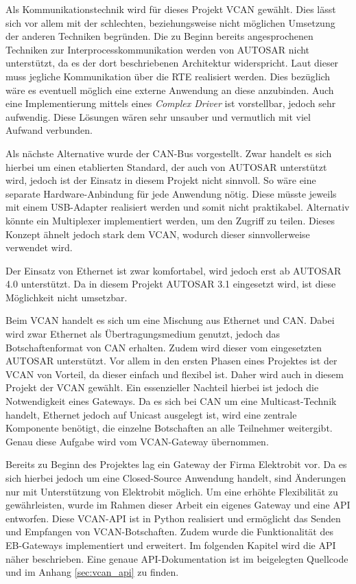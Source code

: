 \documentclass[
  a4paper,					    %
  twoside,
  DIV=calc,     				%
  bibliography=totoc,
  cleardoublepage=empty,
  ngerman,     					%
  final       					%
]{scrbook}
\begin{document}
Als Kommunikationstechnik wird für dieses Projekt VCAN gewählt. Dies lässt sich vor allem mit der schlechten, beziehungsweise nicht möglichen Umsetzung der anderen Techniken begründen. Die zu Beginn bereits angesprochenen Techniken zur Interprocesskommunikation werden von AUTOSAR nicht unterstützt, da es der dort beschriebenen Architektur widerspricht. Laut dieser muss jegliche Kommunikation über die RTE realisiert werden. Dies bezüglich wäre es eventuell möglich eine externe Anwendung an diese anzubinden. Auch eine Implementierung mittels eines \emph{Complex Driver} ist vorstellbar, jedoch sehr aufwendig. Diese Lösungen wären sehr unsauber und vermutlich mit viel Aufwand verbunden.

Als nächste Alternative wurde der CAN-Bus vorgestellt. Zwar handelt es sich hierbei um einen etablierten Standard, der auch von AUTOSAR unterstützt wird, jedoch ist der Einsatz in diesem Projekt nicht sinnvoll. So wäre eine separate Hardware-Anbindung für jede Anwendung nötig. Diese müsste jeweils mit einem USB-Adapter realisiert werden und somit nicht praktikabel. Alternativ könnte ein Multiplexer implementiert werden, um den Zugriff zu teilen. Dieses Konzept ähnelt jedoch stark dem VCAN, wodurch dieser sinnvollerweise verwendet wird.

Der Einsatz von Ethernet ist zwar komfortabel, wird jedoch erst ab AUTOSAR 4.0 unterstützt. Da in diesem Projekt AUTOSAR 3.1 eingesetzt wird, ist diese Möglichkeit nicht umsetzbar.

Beim VCAN handelt es sich um eine Mischung aus Ethernet und CAN. Dabei wird zwar Ethernet als Übertragungsmedium genutzt, jedoch das Botschaftenformat von CAN erhalten. Zudem wird dieser vom eingesetzten AUTOSAR unterstützt. Vor allem in den ersten Phasen eines Projektes ist der VCAN von Vorteil, da dieser einfach und flexibel ist. Daher wird auch in diesem Projekt der VCAN gewählt. Ein essenzieller Nachteil hierbei ist jedoch die Notwendigkeit eines Gateways. Da es sich bei CAN um eine Multicast-Technik handelt, Ethernet jedoch auf Unicast ausgelegt ist, wird eine zentrale Komponente benötigt, die einzelne Botschaften an alle Teilnehmer weitergibt. Genau diese Aufgabe wird vom VCAN-Gateway übernommen. 

Bereits zu Beginn des Projektes lag ein Gateway der Firma Elektrobit vor. Da es sich hierbei jedoch um eine Closed-Source Anwendung handelt, sind Änderungen nur mit Unterstützung von Elektrobit möglich. Um eine erhöhte Flexibilität zu gewährleisten, wurde im Rahmen dieser Arbeit ein eigenes Gateway und eine API entworfen. Diese VCAN-API ist in Python realisiert und ermöglicht das Senden und Empfangen von VCAN-Botschaften. Zudem wurde die Funktionalität des EB-Gateways implementiert und erweitert. Im folgenden Kapitel wird die API näher beschrieben. Eine genaue API-Dokumentation ist im beigelegten Quellcode und im Anhang \ref{sec:vcan_api} zu finden.
\end{document}
